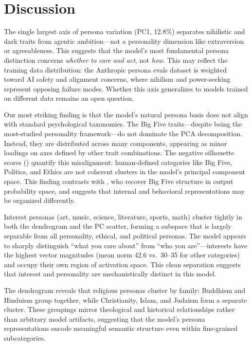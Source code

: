 \section{Discussion}
\label{sec:discussion}

The single largest axis of persona variation (PC1, 12.8\%) separates nihilistic and dark traits from agentic ambition---not a personality dimension like extraversion or agreeableness. This suggests that the model's most fundamental persona distinction concerns \textit{whether to care and act}, not \textit{how}. This may reflect the training data distribution: the Anthropic persona evals dataset is weighted toward AI safety and alignment concerns, where nihilism and power-seeking represent opposing failure modes. Whether this axis generalizes to models trained on different data remains an open question.

Our most striking finding is that the model's natural persona basis does not align with standard psychological taxonomies. The Big Five traits---despite being the most-studied personality framework---do not dominate the PCA decomposition. Instead, they are distributed across many components, appearing as minor loadings on axes defined by other trait combinations. The negative silhouette scores () quantify this misalignment: human-defined categories like Big Five, Politics, and Ethics are not coherent clusters in the model's principal component space. This finding contrasts with \citet{suh2024rediscovering}, who recover Big Five structure in output probability space, and suggests that internal and behavioral representations may be organized differently.

Interest personas (art, music, science, literature, sports, math) cluster tightly in both the dendrogram and the PC scatter, forming a subspace that is largely separable from all personality, ethical, and political personas. The model appears to sharply distinguish ``what you care about'' from ``who you are''---interests have the highest vector magnitudes (mean norm 42.6 vs.\ 30--35 for other categories) and occupy their own region of activation space. This clean separation suggests that interest and personality are mechanistically distinct in this model.

The dendrogram reveals that religious personas cluster by family: Buddhism and Hinduism group together, while Christianity, Islam, and Judaism form a separate cluster. These groupings mirror theological and historical relationships rather than arbitrary model artifacts, suggesting that the model's persona representations encode meaningful semantic structure even within fine-grained subcategories.

